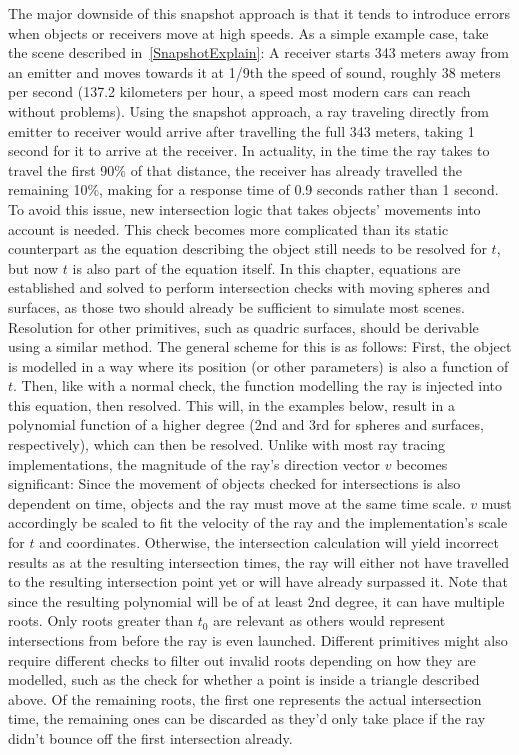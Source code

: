 The major downside of this snapshot approach is that it tends to introduce errors when objects or receivers move at high speeds.
As a simple example case, take the scene described in~\ref{SnapshotExplain}:
A receiver starts 343 meters away from an emitter and moves towards it at 1/9th the speed of sound, roughly 38 meters per second
(137.2 kilometers per hour, a speed most modern cars can reach without problems).
\newline
Using the snapshot approach, a ray traveling directly from emitter to receiver would arrive after travelling the full 343 meters,
taking 1 second for it to arrive at the receiver.
In actuality, in the time the ray takes to travel the first 90\% of that distance,
the receiver has already travelled the remaining 10\%, making for a response time of 0.9 seconds rather than 1 second.
\newline
To avoid this issue, new intersection logic that takes objects' movements into account is needed.
This check becomes more complicated than its static counterpart as the equation describing the object still needs to be resolved for \(t\),
but now \(t\) is also part of the equation itself.
In this chapter, equations are established and solved to perform intersection checks with moving spheres and surfaces,
as those two should already be sufficient to simulate most scenes.
Resolution for other primitives, such as quadric surfaces, should be derivable using a similar method.
\newline
The general scheme for this is as follows:
First, the object is modelled in a way where its position (or other parameters) is also a function of \(t\).
Then, like with a normal check, the function modelling the ray is injected into this equation,
then resolved.
This will, in the examples below, result in a polynomial function of a higher degree
(2nd and 3rd for spheres and surfaces, respectively), which can then be resolved.
\newline
Unlike with most ray tracing implementations, the magnitude of the ray's direction vector \(v\) becomes significant:
Since the movement of objects checked for intersections is also dependent on time,
objects and the ray must move at the same time scale.
\(v\) must accordingly be scaled to fit the velocity of the ray and the implementation's scale for \(t\) and coordinates.
Otherwise, the intersection calculation will yield incorrect results as at the resulting intersection times,
the ray will either not have travelled to the resulting intersection point yet or will have already surpassed it.
\newline
Note that since the resulting polynomial will be of at least 2nd degree, it can have multiple roots.
Only roots greater than \(t_0\) are relevant as others would represent intersections from before the ray is even launched.
Different primitives might also require different checks to filter out invalid roots depending on how they are modelled,
such as the check for whether a point is inside a triangle described above.
Of the remaining roots, the first one represents the actual intersection time,
the remaining ones can be discarded as they'd only take place if the ray didn't bounce off the first intersection already.

